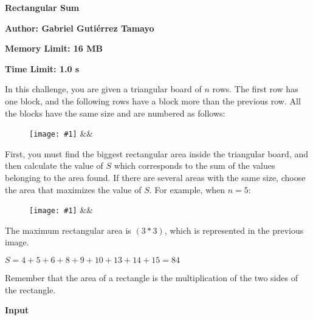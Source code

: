 \documentclass{article}
\newcommand{\englishProblemHeader}[4]{
	\begin{center} {\huge \sf \bfseries #1} \end{center}
	\vspace{-2mm}
	\centerline{\sf \bfseries Author: #2}
	\vspace{1mm}
	\centerline{\sf \bfseries Memory Limit: #3}
	\vspace{1mm}
	\centerline{\sf \bfseries Time Limit: #4}
	\vspace{10mm}
}
\newcommand{\printSubtitle}[1]{
	\vspace{1mm}
	\begin{flushleft} {\Large \sf \bfseries #1 \newline} \end{flushleft}
	\vspace{-4mm}
}
\newcommand{\image}[4]{
	\begin{figure}[h]
		\centering
		\texttt{[image: \#1]}
		\ifx&#4&\empty
		\else
			\caption{#4}
		\fi
	\end{figure}
}
\begin{document}


\englishProblemHeader{Rectangular Sum}{Gabriel Gutiérrez Tamayo}{16 MB}{1.0 s}




In this challenge, you are given a triangular board of $ n $ rows. The first row has one block, and the following rows
have a block more than the previous row. All the blocks have the same size and are numbered as follows:
\newline

\image{images/figure-1-block-numbering.png}{4.6cm}{4cm}{}

First, you must find the biggest rectangular area inside the triangular board, and then calculate the value of $ S $
which corresponds to the sum of the values belonging to the area found. If there are several areas with the same size,
choose the area that maximizes the value of $ S $. For example, when $ n = 5 $:

\image{images/figure-2-example-n-equal-5.png}{4cm}{4.15cm}{}

The maximum rectangular area is $ (3 * 3) $, which is represented in the previous image.
\newline

$ S = 4 + 5 + 6 + 8 + 9 + 10 + 13 + 14 + 15 = 84 $
\newline

Remember that the area of a rectangle is the multiplication of the two sides of the rectangle.
\newline




\printSubtitle{Input}
\end{document}

